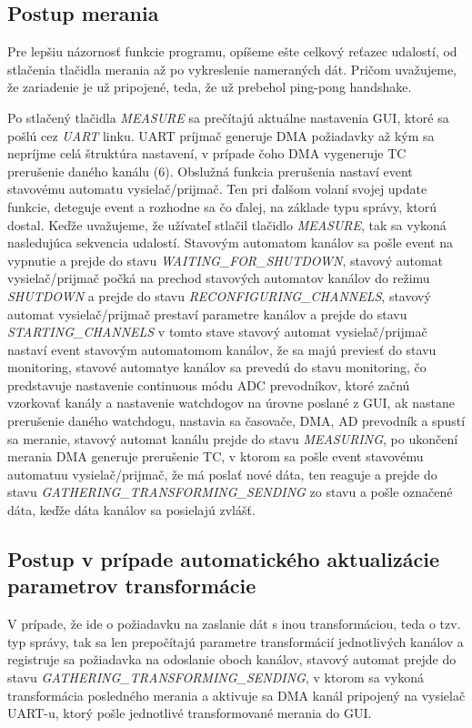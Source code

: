 \documentclass[main.tex]{subfiles}
\begin{document}
\begin{multicols*}{2}
			\subsection{Postup merania}
			Pre lepšiu názornosť funkcie programu, opíšeme ešte celkový reťazec udalostí, od stlačenia tlačidla merania až po vykreslenie nameraných dát. Pričom uvažujeme, že zariadenie je už pripojené, teda, že už prebehol ping-pong handshake.
			
			Po stlačený tlačidla \textit{MEASURE} sa prečítajú aktuálne nastavenia GUI, ktoré sa pošlú cez \textit{UART} linku. UART príjmač generuje DMA požiadavky až kým sa nepríjme celá štruktúra nastavení, v prípade čoho DMA vygeneruje TC prerušenie daného kanálu (6).  Obslužná funkcia prerušenia nastaví event stavovému automatu vysielač/prijmač. Ten pri ďalšom volaní svojej update funkcie, deteguje event a rozhodne sa čo ďalej, na základe typu správy, ktorú dostal. Keďže uvažujeme, že užívateľ stlačil tlačidlo \textit{MEASURE}, tak sa vykoná nasledujúca sekvencia udalostí. Stavovým automatom kanálov sa pošle event na vypnutie a prejde do stavu \textit{WAITING\_FOR\_SHUTDOWN}, stavový automat vysielač/prijmač počká na prechod stavových automatov kanálov do režimu \textit{SHUTDOWN} a prejde do stavu \textit{RECONFIGURING\_CHANNELS}, stavový automat vysielač/prijmač prestaví parametre kanálov a prejde do stavu \textit{STARTING\_CHANNELS} v tomto stave stavový automat vysielač/prijmač nastaví event stavovým automatomom kanálov, že sa majú previesť do stavu monitoring, stavové automatye kanálov sa prevedú do stavu monitoring, čo predstavuje nastavenie continuous módu ADC prevodníkov, ktoré začnú vzorkovať kanály a nastavenie watchdogov na úrovne poslané z GUI, ak nastane prerušenie daného watchdogu, nastavia sa časovače, DMA, AD prevodník a spustí sa meranie, stavový automat kanálu prejde do stavu \textit{MEASURING}, po ukončení merania DMA generuje prerušenie TC, v ktorom sa pošle event stavovému automatuu vysielač/prijmač, že má poslať nové dáta, ten reaguje a prejde do stavu \textit{GATHERING\_TRANSFORMING\_SENDING} zo stavu  a pošle označené dáta, keďže dáta kanálov sa posielajú zvlášť.
			
			\subsection{Postup v prípade automatického aktualizácie parametrov transformácie}
			 V prípade, že ide o požiadavku na zaslanie dát s inou transformáciou, teda o tzv.  typ správy, tak sa len prepočítajú parametre transformácií jednotlivých kanálov a registruje sa požiadavka na odoslanie oboch kanálov, stavový automat prejde do stavu \textit{GATHERING\_TRANSFORMING\_SENDING}, v ktorom sa vykoná transformácia posledného merania a aktivuje sa DMA kanál pripojený na vysielač UART-u, ktorý pošle jednotlivé transformované merania do GUI.
			 
			 
		\end{multicols*}
\end{document}
